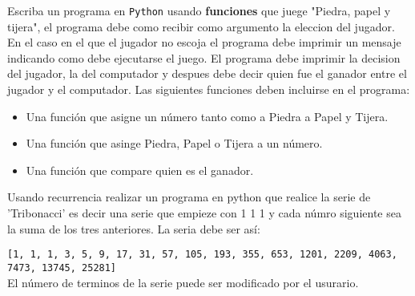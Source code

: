 \documentclass[11pt,letterpaper]{exam}
\begin{document}
\begin{questions}

\question[50] Escriba un programa en \verb+Python+ usando {\bf funciones} que juege "Piedra, papel y tijera", el programa debe como recibir como argumento 
la eleccion del jugador. En el caso en el que el jugador no escoja el programa debe imprimir un mensaje indicando como debe ejecutarse el juego. El programa
debe imprimir la decision del jugador, la del computador y despues debe decir quien fue el ganador entre el jugador y el computador. Las siguientes funciones deben incluirse en el programa:

\begin{itemize}
\item Una funci\'on que asigne un n\'umero tanto como a Piedra a Papel y Tijera.
\item Una funci\'on que asinge Piedra, Papel o Tijera a un n\'umero.
\item Una funci\'on que compare quien es el ganador. 
\end{itemize}



\question[50] Usando recurrencia realizar un programa en python que realice la serie de 'Tribonacci' es decir una serie que empieze con 1 1 1 y cada n\'umro siguiente sea la suma de los tres anteriores. La seria debe ser as\'i:

\verb+[1, 1, 1, 3, 5, 9, 17, 31, 57, 105, 193, 355, 653, 1201, 2209, 4063, 7473, 13745, 25281]+\\

El n\'umero de terminos  de la serie puede ser modificado por el usurario.



\end{questions}
\end{document}

